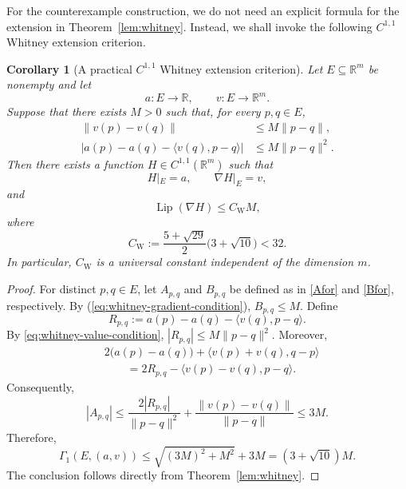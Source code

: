 \documentclass[11pt]{article}
\numberwithin{equation}{section}
\newtheorem{theorem}{Theorem}[section]
\newtheorem{corollary}[theorem]{Corollary}
\newcommand{\R}{\mathbb{R}}
\newcommand{\ip}[2]{\left\langle #1,#2\right\rangle}
\newcommand{\norm}[1]{\left\lVert #1\right\rVert}
\newcommand{\Lip}{\operatorname{Lip}}
\begin{document}
%


For the counterexample construction, we do not need an explicit formula for
the extension in Theorem~\ref{lem:whitney}. Instead, we shall invoke the
following  \(C^{1,1}\) Whitney extension criterion.



\begin{corollary}[A practical  \(C^{1,1}\) Whitney extension criterion]
\label{cor:practical-whitney}
Let \(E\subseteq\mathbb R^m\) be nonempty and let
\[
a:E\to\mathbb R,
\qquad
v:E\to\mathbb R^m.
\]
Suppose that there exists \(M>0\) such that, for every \(p,q\in E\),
\begin{align}
\|v(p)-v(q)\|
&\le M\|p-q\|,
\label{eq:whitney-gradient-condition}\\
\bigl|a(p)-a(q)-\langle v(q),p-q\rangle\bigr|
&\le M\|p-q\|^2.
\label{eq:whitney-value-condition}
\end{align}
Then there exists a function \(H\in C^{1,1}(\mathbb R^m)\) such that
\[
H|_E=a,
\qquad
\nabla H|_E=v,
\]
and
\[
\operatorname{Lip}(\nabla H)
\le C_{\mathrm W}M,
\]
where
\[
C_{\mathrm W}
:=
\frac{5+\sqrt{29}}{2}\bigl(3+\sqrt{10}\bigr)
<32.
\]
In particular, \(C_{\mathrm W}\) is a universal constant independent of
the dimension \(m\).
\end{corollary}

\begin{proof}
For distinct \(p,q\in E\), let \(A_{p,q}\) and \(B_{p,q}\) be defined as in
\eqref{Afor} and \eqref{Bfor}, respectively. By
(\ref{eq:whitney-gradient-condition}),
$
B_{p,q}\le M.
$
Define
\[
R_{p,q}
:=
a(p)-a(q)-\langle v(q),p-q\rangle.
\]
By \eqref{eq:whitney-value-condition},
$
|R_{p,q}|\le M\|p-q\|^2.
$
Moreover,
\begin{align*}
&2\bigl(a(p)-a(q)\bigr)
 +\langle v(p)+v(q),q-p\rangle\\
&\qquad
=2R_{p,q}-\langle v(p)-v(q),p-q\rangle.
\end{align*}
Consequently,
\[
|A_{p,q}|
\le
\frac{2|R_{p,q}|}{\|p-q\|^2}
+
\frac{\|v(p)-v(q)\|}{\|p-q\|}
\le 3M.
\]
Therefore,
\[
\Gamma_1(E,(a,v))
\le
\sqrt{(3M)^2+M^2}+3M
=
(3+\sqrt{10})M.
\]
The conclusion follows directly from Theorem~\ref{lem:whitney}.
\end{proof}
\end{document}
